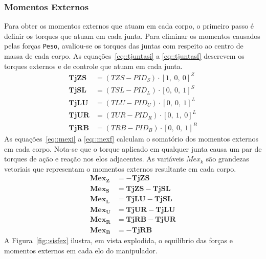 \medskip {}

\subsubsection{Momentos Externos}

Para obter os momentos externos que atuam em cada corpo, o primeiro passo é
definir os torques que atuam em cada junta. Para eliminar os momentos causados
pelas forças \texttt{Peso}, avaliou-se os torques das juntas com respeito ao
centro de massa de cada corpo. As equações~\ref{eq::tjuntasi} a
\ref{eq::tjuntasf} descrevem os torques externos e de controle que atuam em cada
junta.
\begin{align}
	\mathbf{TjZS} &= (TZS - PID_{S})\cdot[1,~0,~0]^Z \label{eq::tjuntasi} \\
	\mathbf{TjSL} &= (TSL - PID_{L})\cdot[0,~0,~1]^S \\
	\mathbf{TjLU} &= (TLU - PID_{U})\cdot[0,~0,~1]^L \\
	\mathbf{TjUR} &= (TUR - PID_{R})\cdot[0,~1,~0]^L \\
	\mathbf{TjRB} &= (TRB - PID_{B})\cdot[0,~0,~1]^B \label{eq::tjuntasf}
\end{align}
%
As equações~\ref{eq::mexi} a \ref{eq::mexf} calculam o somatório dos momentos
externos em cada corpo. Nota-se que o torque aplicado em qualquer junta causa
um par de torques de ação e reação nos elos adjacentes. As variáveis $Mex_k$ são
grandezas vetoriais que representam o momentos externos resultante em cada
corpo.
%
\begin{align}
	\mathbf{Mex_{Z}} &= - \mathbf{TjZS } \label{eq::mexi}\\
	\mathbf{Mex_{S}} &= \mathbf{TjZS} - \mathbf{TjSL }\\
	\mathbf{Mex_{L}} &= \mathbf{TjLU }- \mathbf{TjSL }\\
	\mathbf{Mex_{U}} &= \mathbf{TjUR }- \mathbf{TjLU }\\
	\mathbf{Mex_{R}} &= \mathbf{TjRB }- \mathbf{TjUR }\\
	\mathbf{Mex_{B}} &= - \mathbf{TjRB} \label{eq::mexf}
	\end{align}
%
A Figura~\ref{fig::sisfex} ilustra, em vista explodida, o equilíbrio das forças e
momentos externos em cada elo do manipulador.
%
